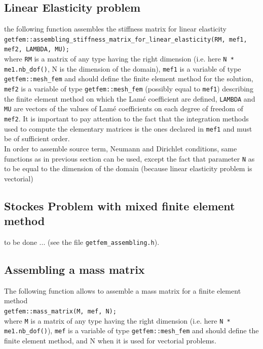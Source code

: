 \documentclass[11pt,a4paper]{article}
\begin{document}
\subsection{Linear Elasticity problem}

the following function assembles the stiffness matrix for linear elasticity\\[0.5cm]
{\tt getfem::assembling\_stiffness\_matrix\_for\_linear\_elasticity(RM, mef1, mef2, LAMBDA, MU); } \\[0.5cm]
where {\tt RM} is a matrix of any type having the right dimension (i.e. here {\tt N * me1.nb\_dof()}, N is the dimension of the domain), {\tt mef1} is a variable of type {\tt getfem::mesh\_fem} and should define the finite element method for the solution, {\tt mef2}  is a variable of type {\tt getfem::mesh\_fem} (possibly equal to {\tt mef1}) describing the finite element method on which the Lam{\'e} coefficient are defined, {\tt LAMBDA} and {\tt MU} are vectors of the values of Lam{\'e} coefficients on each degree of freedom of {\tt mef2}. It is important to pay attention to the fact that the integration methods used to compute the elementary matrices is the ones declared in {\tt mef1} and must be of sufficient order.\\[0.5cm]

In order to assemble source term, Neumann and Dirichlet conditions, same functions as in previous section can be used, except the fact that parameter {\tt N} as to be equal to the dimension of the domain (because linear elasticity problem is vectorial)

\subsection{Stockes Problem with mixed finite element method}

to be done ... (see the file {\tt getfem\_assembling.h}).
 
\subsection{Assembling a mass matrix}

The following function allows to assemble a mass matrix for a finite element method\\[0.5cm]
{\tt getfem::mass\_matrix(M, mef, N); } \\[0.5cm]
where {\tt M} is a matrix of any type having the right dimension (i.e. here {\tt N * me1.nb\_dof()}), {\tt mef} is a variable of type {\tt getfem::mesh\_fem} and should define the finite element method, and N when it is used for vectorial problems.
\end{document}
